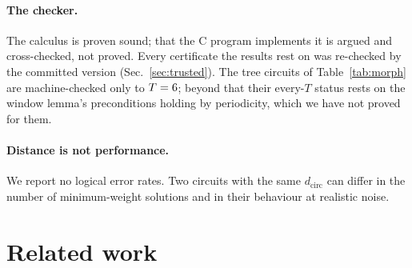 \documentclass[aps,pra,twocolumn,superscriptaddress,nofootinbib,longbibliography,floatfix]{revtex4-2}
\newcommand{\dc}{d_{\mathrm{circ}}}
\begin{document}
\paragraph*{The checker.} The calculus is proven sound; that the C program implements it is argued and cross-checked, not proved. Every certificate the results rest on was re-checked by the committed version (Sec.~\ref{sec:trusted}). The tree circuits of Table~\ref{tab:morph} are machine-checked only to $T=6$; beyond that their every-$T$ status rests on the window lemma's preconditions holding by periodicity, which we have not proved for them.

\paragraph*{Distance is not performance.} We report no logical error rates. Two circuits with the same $\dc$ can differ in the number of minimum-weight solutions and in their behaviour at realistic noise.

\section{Related work}
\label{sec:related}
\end{document}
